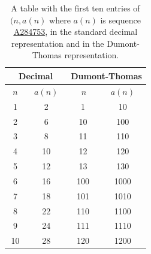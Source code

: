 \documentclass[12pt,reqno]{article}
\newcommand{\seqnum}[1]{\href{https://oeis.org/#1}{\rm \underline{#1}}}
\begin{document}
\begin{table}[h!]
\centering
\caption{A table with the first ten entries of $(n,a(n)$ where $a(n)$ is sequence \seqnum{A284753}, in the standard decimal representation and in the Dumont-Thomas representation. }\label{tbl:2}
\begin{tabular}{|c|c||c|c|}
\hline
\multicolumn{2}{|c||}{\textbf{\ \ Decimal\ \ }} & \multicolumn{2}{|c|}{\textbf{Dumont-Thomas}} \\
\hline
$n$ & $a(n)$ & $\ \ \  n\ \ $ & $a(n)$  \\
\hline
1  & 2  & 1 &  10\\
2  & 6  & 10 & 100 \\
3  & 8  & 11 & 110 \\
4  & 10 & 12 & 120 \\
5  & 12 & 13 & 130 \\
6  & 16 & 100 &1000  \\
7  & 18 & 101 &1010  \\
8  & 22 & 110 &1100  \\
9  & 24 & 111 &1110  \\
10 & 28 & 120 &1200  \\
\hline
\end{tabular}
\end{table}
\end{document}
